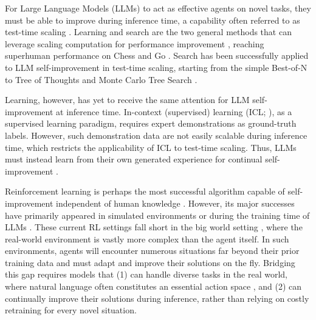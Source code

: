 \documentclass{article} %
\newcommand{\0}{\mathbf{0}}
\begin{document}
For Large Language Models (LLMs) to act as effective agents on novel tasks, they must be able to improve during inference time, a capability often referred to as test-time scaling \citep{tts}. Learning and search are the two general methods that can leverage scaling computation for performance improvement \citep{sutton2019bitter}, reaching superhuman performance on Chess \citep{campbell2002deepblue} and Go \citep{silver2016mastering}. Search has been successfully applied to LLM self-improvement in test-time scaling, starting from the simple Best-of-N \citep{best-of-n} to Tree of Thoughts \citep{tot} and Monte Carlo Tree Search \citep{everything-of-thought}. 

Learning, however, has yet to receive the same attention for LLM self-improvement at inference time. In-context (supervised) learning (ICL; \citet{ICL}), as a supervised learning paradigm, requires expert demonstrations as ground-truth labels. However, such demonstration data are not easily scalable during inference time, which restricts the applicability of ICL to test-time scaling. Thus, LLMs must instead learn from their own generated experience for continual self-improvement \citep{silver2024era}.


Reinforcement learning is perhaps the most successful algorithm capable of self-improvement independent of human knowledge \citep{silver2017mastering}. However, its major successes have primarily appeared in simulated environments \citep{mnih2015human, silver2016mastering} or during the training time of LLMs \citet{guo2025deepseek}. These current RL settings fall short in the big world setting \citep{javed2024bigworld}, where the real-world environment is vastly more complex than the agent itself. In such environments, agents will encounter numerous situations far beyond their prior training data and must adapt and improve their solutions on the fly. Bridging this gap requires models that (1) can handle diverse tasks in the real world, where natural language often constitutes an essential action space \citep{silver2025welcome}, and (2) can continually improve their solutions during inference, rather than relying on costly retraining for every novel situation.




\end{document}
